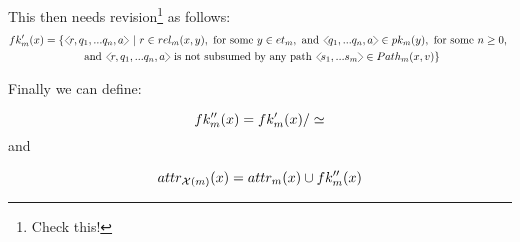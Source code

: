 \documentclass[10pt,a4paper]{article}
\begin{document}
This then needs revision\footnote{Check this!} as follows:
\begin{multline}
\fkp{x} = \setsuchthat{\tuple{r,q_1,...q_n,a}}
                      {r \in \rel{x}{y},
                                  \text{ for some } y \in \et,
																	\text{ and } \tuple{q_1,...q_n,a} \in \pk{y},
																	\text{ for some } n \geq 0,                   \right. \\        
											\left.		\text{ and } \tuple{r, q_1,...q_n,a}
																	\text{ is not subsumed by any path }
																	      \tuple{s_1,...s_m} \in \path{x}{v}
											}			                   
\end{multline}

Finally we can define:

\begin{equation}
\fkpp{x} = \fkp{x}/\simeq
\end{equation}
and 

\begin{equation}
\attr[\chiM]{x}  = \attr{x}  \cup  \fkpp{x}
\end{equation}
\end{document}
